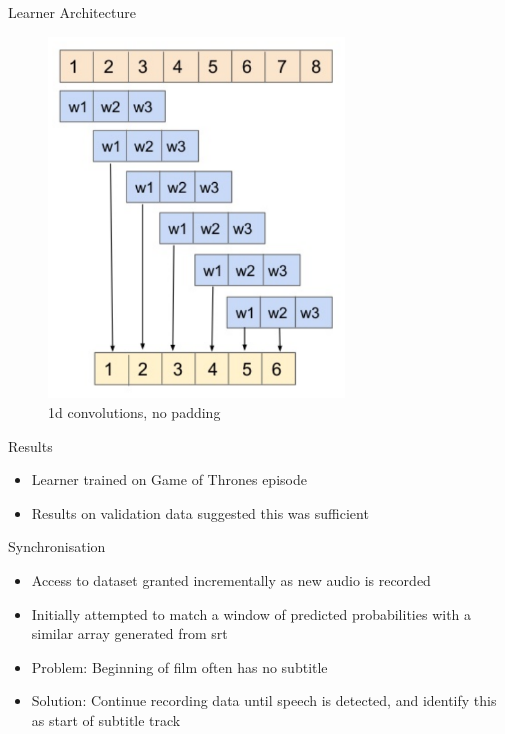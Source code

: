 \documentclass[notes]{beamer}
\begin{document}
\begin{frame}{Learner Architecture}
\begin{minipage}{0.45\textwidth}
\begin{figure}
		\includegraphics[width=0.7\textwidth]{figures/1dconv_nopad}
		\caption{1d convolutions, no padding}
	\end{figure}
	
\end{minipage}
\end{frame}


\begin{frame}{Results}
\begin{itemize}
	\item Learner trained on Game of Thrones episode
	\item Results on validation data suggested this was sufficient
\end{itemize}
\end{frame}


\begin{frame}{Synchronisation}
\begin{itemize}
	\item Access to dataset granted incrementally as new audio is recorded
	\item Initially attempted to match a window of predicted probabilities with a similar array generated from srt
	\item Problem: Beginning of film often has no subtitle
	\item Solution: Continue recording data until speech is detected, and identify this as start of subtitle track
\end{itemize}
\end{frame}
\end{document}
